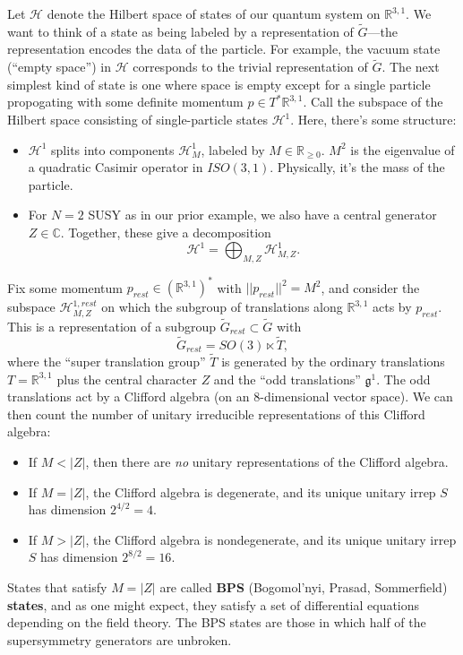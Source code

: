 Let $\mathcal{H}$ denote the Hilbert space of states of our quantum
system on $\mathbb{R}^{3,1}$. We want to think of a state as being
labeled by a representation of $\tilde{G}$---the representation encodes
the data of the particle. For example, the vacuum state (``empty
space'') in $\mathcal{H}$ corresponds to the trivial representation
of $\tilde{G}$. The next simplest kind of state is one where space
is empty except for a single particle propogating with some definite
momentum $p\in T^{*}\mathbb{R}^{3,1}$. Call the subspace of the Hilbert
space consisting of single-particle states $\mathcal{H}^{1}$. Here,
there's some structure:
\begin{itemize}
\item $\mathcal{H}^{1}$ splits into components $\mathcal{H}_{M}^{1}$,
labeled by $M\in\mathbb{R}_{\geq0}$. $M^{2}$ is the eigenvalue of
a quadratic Casimir operator in $ISO(3,1)$. Physically, it's the
mass of the particle.
\item For $N=2$ SUSY as in our prior example, we also have a central generator
$Z\in\mathbb{C}$. Together, these give a decomposition
\[
\mathcal{H}^{1}=\bigoplus_{M,Z}\mathcal{H}_{M,Z}^{1}.
\]

\end{itemize}
Fix some momentum $p_{rest}\in\left(\mathbb{R}^{3,1}\right)^{*}$
with $||p_{rest}||^{2}=M^{2}$, and consider the subspace $\mathcal{H}_{M,Z}^{1,rest}$
on which the subgroup of translations along $\mathbb{R}^{3,1}$ acts
by $p_{rest}$. This is a representation of a subgroup $\tilde{G}_{rest}\subset\tilde{G}$
with
\[
\tilde{G}_{rest}=SO\left(3\right)\ltimes\tilde{T},
\]
where the ``super translation group'' $\tilde{T}$ is generated
by the ordinary translations $T=\mathbb{R}^{3,1}$ plus the central
character $Z$ and the ``odd translations'' $\mathfrak{g}^{1}$.
The odd translations act by a Clifford algebra (on an 8-dimensional
vector space). We can then count the number of unitary irreducible
representations of this Clifford algebra:
\begin{itemize}
\item If $M<\left|Z\right|$, then there are \emph{no} unitary representations
of the Clifford algebra.
\item If $M=\left|Z\right|$, the Clifford algebra is degenerate, and its
unique unitary irrep $S$ has dimension $2^{4/2}=4$.
\item If $M>\left|Z\right|$, the Clifford algebra is nondegenerate, and
its unique unitary irrep $S$ has dimension $2^{8/2}=16$.
\end{itemize}
States that satisfy $M=\left|Z\right|$ are called \textbf{BPS} (Bogomol'nyi,
Prasad, Sommerfield) \textbf{states}, and as one might expect, they
satisfy a set of differential equations depending on the field theory.
The BPS states are those in which half of the supersymmetry generators
are unbroken.


